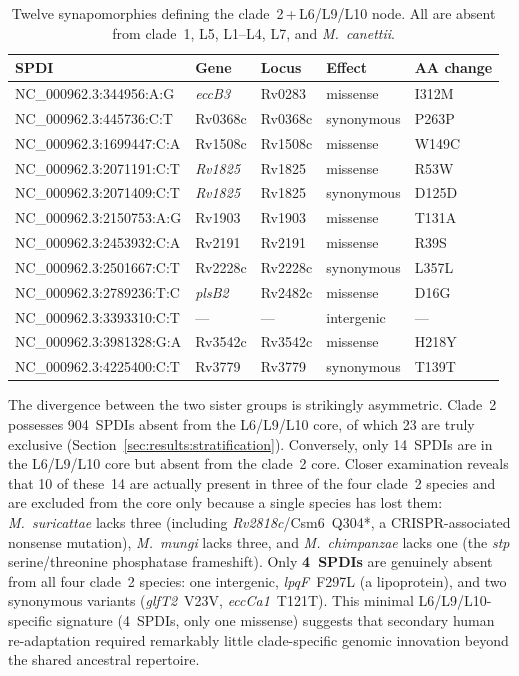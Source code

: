 \documentclass[11pt,a4paper]{article}
\newcommand{\Msur}{\textit{M.~suricattae}}
\newcommand{\Mmun}{\textit{M.~mungi}}
\newcommand{\Mchi}{\textit{M.~chimpanzae}}
\begin{document}
\begin{table}[h]
\centering
\caption{Twelve synapomorphies defining the clade~2\,+\,L6/L9/L10 node.
All are absent from clade~1, L5, L1--L4, L7, and \textit{M.~canettii}.}
\label{tab:synapo_c2_l6l9l10}
\begin{tabular}{@{}lllll@{}}
\toprule
SPDI & Gene & Locus & Effect & AA change \\
\midrule
NC\_000962.3:344956:A:G   & \textit{eccB3}  & Rv0283  & missense   & I312M \\
NC\_000962.3:445736:C:T   & Rv0368c         & Rv0368c & synonymous & P263P \\
NC\_000962.3:1699447:C:A  & Rv1508c         & Rv1508c & missense   & W149C \\
NC\_000962.3:2071191:C:T  & \textit{Rv1825} & Rv1825  & missense   & R53W \\
NC\_000962.3:2071409:C:T  & \textit{Rv1825} & Rv1825  & synonymous & D125D \\
NC\_000962.3:2150753:A:G  & Rv1903          & Rv1903  & missense   & T131A \\
NC\_000962.3:2453932:C:A  & Rv2191          & Rv2191  & missense   & R39S \\
NC\_000962.3:2501667:C:T  & Rv2228c         & Rv2228c & synonymous & L357L \\
NC\_000962.3:2789236:T:C  & \textit{plsB2}  & Rv2482c & missense   & D16G \\
NC\_000962.3:3393310:C:T  & ---             & ---     & intergenic & --- \\
NC\_000962.3:3981328:G:A  & Rv3542c         & Rv3542c & missense   & H218Y \\
NC\_000962.3:4225400:C:T  & Rv3779          & Rv3779  & synonymous & T139T \\
\bottomrule
\end{tabular}
\end{table}

The divergence between the two sister groups is strikingly asymmetric.
%
Clade~2 possesses 904~SPDIs absent from the L6/L9/L10 core, of which
23 are truly exclusive (Section~\ref{sec:results:stratification}).
%
Conversely, only 14~SPDIs are in the L6/L9/L10 core but absent from the
clade~2 core.
%
Closer examination reveals that 10 of these~14 are actually present in
three of the four clade~2 species and are excluded from the core only
because a single species has lost them: \Msur{} lacks three (including
\textit{Rv2818c}/Csm6~Q304*, a CRISPR-associated nonsense mutation),
\Mmun{} lacks three, and \Mchi{} lacks one (the \textit{stp} serine/threonine
phosphatase frameshift).
%
Only \textbf{4~SPDIs} are genuinely absent from all four clade~2 species:
one intergenic, \textit{lpqF}~F297L (a lipoprotein), and two synonymous
variants (\textit{glfT2}~V23V, \textit{eccCa1}~T121T).
%
This minimal L6/L9/L10-specific signature (4~SPDIs, only one missense)
suggests that secondary human re-adaptation required remarkably little
clade-specific genomic innovation beyond the shared ancestral repertoire.
\end{document}
